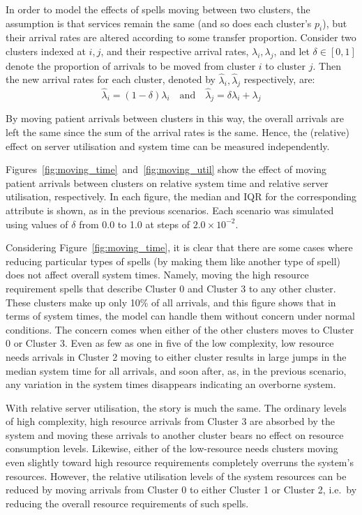 \documentclass[11pt]{article}
\begin{document}
In order to model the effects of spells moving between two clusters, the
assumption is that services remain the same (and so does each cluster's
\(p_i\)), but their arrival rates are altered according to some transfer
proportion. Consider two clusters indexed at \(i, j\), and their respective
arrival rates, \(\lambda_i, \lambda_j\), and let \(\delta \in [0, 1]\) denote
the proportion of arrivals to be moved from cluster \(i\) to cluster \(j\). Then
the new arrival rates for each cluster, denoted by \(\hat\lambda_i,
\hat\lambda_j\) respectively, are:
\begin{equation}\label{eq:moving}
    \hat\lambda_i = \left(1 - \delta\right) \lambda_i
    \quad \text{and} \quad
    \hat\lambda_j = \delta\lambda_i + \lambda_j
\end{equation}

By moving patient arrivals between clusters in this way, the overall arrivals
are left the same since the sum of the arrival rates is the same. Hence, the
(relative) effect on server utilisation and system time can be measured
independently.

Figures~\ref{fig:moving_time}~and~\ref{fig:moving_util} show the effect of
moving patient arrivals between clusters on relative system time and relative
server utilisation, respectively. In each figure, the median and IQR for the
corresponding attribute is shown, as in the previous scenarios. Each scenario
was simulated using values of \(\delta\) from 0.0 to 1.0 at steps of \(2.0
\times 10^{-2}\).

Considering Figure~\ref{fig:moving_time}, it is clear that there are some cases
where reducing particular types of spells (by making them like another type of
spell) does not affect overall system times. Namely, moving the high resource
requirement spells that describe Cluster 0 and Cluster 3 to any other cluster.
These clusters make up only 10\% of all arrivals, and this figure shows that in
terms of system times, the model can handle them without concern under normal
conditions. The concern comes when either of the other clusters moves to Cluster
0 or Cluster 3. Even as few as one in five of the low complexity, low resource
needs arrivals in Cluster 2 moving to either cluster results in large jumps in
the median system time for all arrivals, and soon after, as, in the previous
scenario, any variation in the system times disappears indicating an overborne
system.

With relative server utilisation, the story is much the same. The ordinary
levels of high complexity, high resource arrivals from Cluster 3 are absorbed by
the system and moving these arrivals to another cluster bears no effect on
resource consumption levels. Likewise, either of the low-resource needs clusters
moving even slightly toward high resource requirements completely overruns the
system’s resources. However, the relative utilisation levels of the system
resources can be reduced by moving arrivals from Cluster 0 to either Cluster 1
or Cluster 2, i.e.\ by reducing the overall resource requirements of such spells. 
\end{document}
